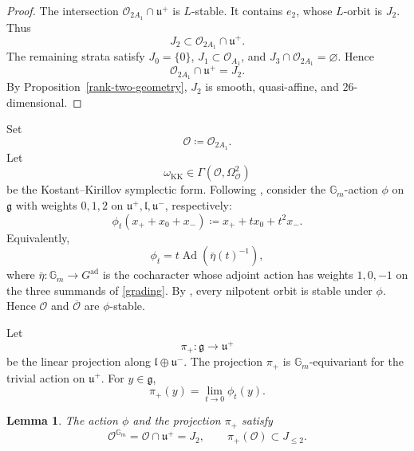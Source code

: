 \documentclass[12pt]{article}
\newtheorem{lemma}[theorem]{Lemma}
\theoremstyle{definition}
\DeclareMathOperator{\Ad}{Ad}
\begin{document}
\begin{proof}
The intersection \(\mathcal O_{2A_1}\cap\mathfrak u^+\) is \(L\)-stable.
It contains \(e_2\), whose \(L\)-orbit is \(J_2\). Thus
\[
    J_2\subset\mathcal O_{2A_1}\cap\mathfrak u^+.
\]
The remaining strata satisfy \(J_0=\{0\}\),
\(J_1\subset\mathcal O_{A_1}\), and
\(J_3\cap\mathcal O_{2A_1}=\varnothing\). Hence
\[
    \mathcal O_{2A_1}\cap\mathfrak u^+=J_2.
\]
By Proposition~\ref{rank-two-geometry}, \(J_2\) is smooth,
quasi-affine, and \(26\)-dimensional.
\end{proof}

Set
\[
    \mathcal O\coloneqq\mathcal O_{2A_1}.
\]
Let
\[
    \omega_{\mathrm{KK}}\in\Gamma(\mathcal O,\Omega^2_{\mathcal O})
\]
be the Kostant--Kirillov symplectic form. Following
\cite[Section~4.2 and Lemma~4.1]{FuLiu}, consider the
\(\mathbb G_m\)-action \(\phi\) on \(\mathfrak g\) with weights \(0,1,2\)
on \(\mathfrak u^+,\mathfrak l,\mathfrak u^-\), respectively:
\[
    \phi_t(x_++x_0+x_-)
    \coloneqq
    x_++t x_0+t^2x_-.
\]
Equivalently,
\[
    \phi_t=t\Ad(\bar\eta(t)^{-1}),
\]
where \(\bar\eta:\mathbb G_m\to G^{\mathrm{ad}}\) is the cocharacter whose
adjoint action has weights \(1,0,-1\) on the three summands of
\eqref{grading}. By \cite[Lemma~4.1]{FuLiu}, every nilpotent orbit is
stable under \(\phi\). Hence \(\mathcal O\) and \(\overline{\mathcal O}\) are
\(\phi\)-stable.

Let
\[
    \pi_+:\mathfrak g\longrightarrow\mathfrak u^+
\]
be the linear projection along
\(\mathfrak l\oplus\mathfrak u^-\). The projection \(\pi_+\) is
\(\mathbb G_m\)-equivariant for the trivial action on \(\mathfrak u^+\). For
\(y\in\mathfrak g\),
\[
    \pi_+(y)=\lim_{t\to0}\phi_t(y).
\]

\begin{lemma}\label{fixed-data}
The action \(\phi\) and the projection \(\pi_+\) satisfy
\[
    \mathcal O^{\mathbb G_m}=\mathcal O\cap\mathfrak u^+=J_2,
    \qquad
    \pi_+(\mathcal O)\subset J_{\leq2}.
\]
\end{lemma}
\end{document}
